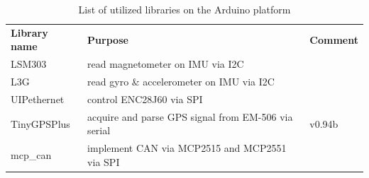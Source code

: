 \documentclass[ExampleMasters.tex]{subfiles}
\begin{document}
\begin{table}[h]
	\label{tab:list_of_arduino_libs}
	\begin{tabular}{lll}
		\textbf{Library name} & \textbf{Purpose}                                    & \textbf{Comment} \\
		LSM303                & read magnetometer on \gls{IMU} via I2C                    &                \cite{lsm303_github}  \\
		L3G                   & read gyro \& accelerometer on \gls{IMU} via I2C           &      
		\cite{l3g_github}            \\
		UIPethernet           &     control ENC28J60 via \gls{SPI}                                                 &             \cite{uip_ethernet_github}     \\
		TinyGPSPlus           & acquire and parse GPS signal from EM-506 via serial & v0.94b\cite{tiny_gps_plus_github}     \\
		mcp\_can & implement \gls{CAN} via MCP2515 and MCP2551 via \gls{SPI}      & \cite{mcp_can_github}
	\end{tabular}
	
	\caption{List of utilized libraries on the Arduino platform}
\end{table}
\end{document}
